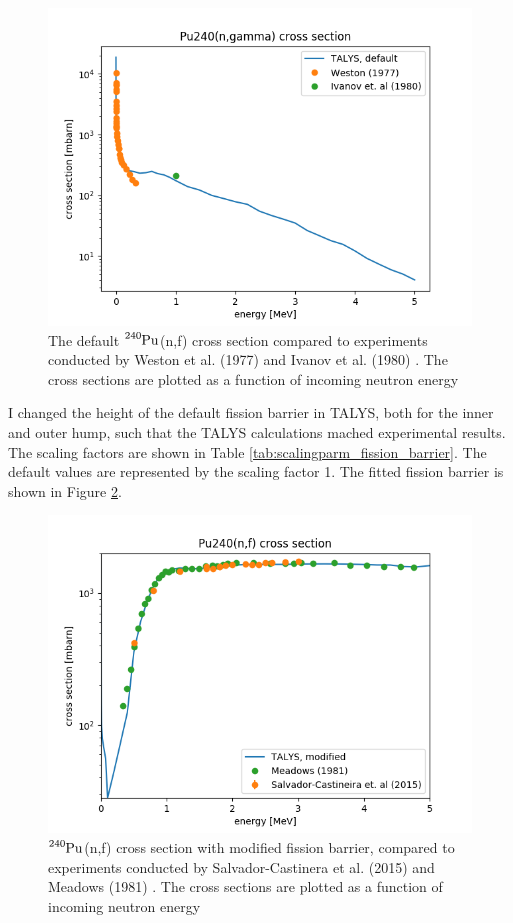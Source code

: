 \documentclass[]{article}
\begin{document}
  \begin{figure} [H]
	\centering
	\includegraphics[scale=0.7]{Default_TALYS_gamma_xs_vs_exp.png}
	\caption{The default $\ce{^{240}Pu}$(n,f) cross section compared to experiments conducted by Weston et al. (1977) \cite{Weston1977} and Ivanov et al. (1980) \cite{Ivanov1980}. The cross sections are plotted as a function of incoming neutron energy }
	\label{fig:Default_TALYS_gamma_xs_vs_exp}
\end{figure}

 \noindent I changed the height of the default fission barrier in TALYS, both for the inner and outer hump, such that the TALYS calculations mached  experimental results. The scaling factors are shown in Table \ref{tab:scalingparm_fission_barrier}. The default values are represented by the scaling factor 1. The fitted fission barrier is shown in Figure \ref{fig:Modified_TALYS_gamma_xs_vs_exp}.

  \begin{figure} [H]
	\centering
	\includegraphics[scale=0.7]{Modified_TALYS_fission_xs_vs_exp.png}
	\caption{ $\ce{^{240}Pu}$(n,f) cross section with modified fission barrier, compared to experiments conducted by Salvador-Castinera et al. (2015) \cite{SALVADORCASTINEIRA2015177} and Meadows (1981) \cite{Meadows198}. The cross sections are plotted as a function of incoming neutron energy}
	\label{fig:Modified_TALYS_gamma_xs_vs_exp}
\end{figure}
\end{document}
